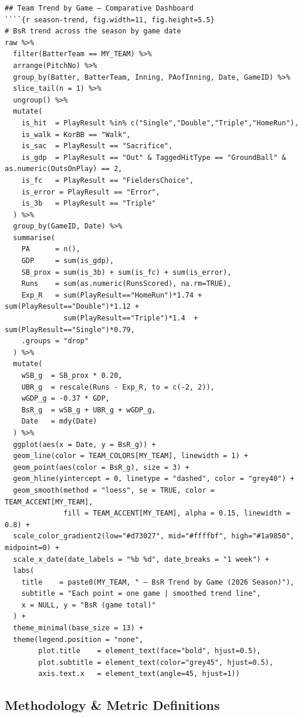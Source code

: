 \documentclass[
]{article}
\begin{document}
\begin{verbatim}
## Team Trend by Game — Comparative Dashboard
````{r season-trend, fig.width=11, fig.height=5.5}
# BsR trend across the season by game date
raw %>%
  filter(BatterTeam == MY_TEAM) %>%
  arrange(PitchNo) %>%
  group_by(Batter, BatterTeam, Inning, PAofInning, Date, GameID) %>%
  slice_tail(n = 1) %>%
  ungroup() %>%
  mutate(
    is_hit  = PlayResult %in% c("Single","Double","Triple","HomeRun"),
    is_walk = KorBB == "Walk",
    is_sac  = PlayResult == "Sacrifice",
    is_gdp  = PlayResult == "Out" & TaggedHitType == "GroundBall" & as.numeric(OutsOnPlay) == 2,
    is_fc   = PlayResult == "FieldersChoice",
    is_error = PlayResult == "Error",
    is_3b   = PlayResult == "Triple"
  ) %>%
  group_by(GameID, Date) %>%
  summarise(
    PA      = n(),
    GDP     = sum(is_gdp),
    SB_prox = sum(is_3b) + sum(is_fc) + sum(is_error),
    Runs    = sum(as.numeric(RunsScored), na.rm=TRUE),
    Exp_R   = sum(PlayResult=="HomeRun")*1.74 + sum(PlayResult=="Double")*1.12 +
              sum(PlayResult=="Triple")*1.4  + sum(PlayResult=="Single")*0.79,
    .groups = "drop"
  ) %>%
  mutate(
    wSB_g  = SB_prox * 0.20,
    UBR_g  = rescale(Runs - Exp_R, to = c(-2, 2)),
    wGDP_g = -0.37 * GDP,
    BsR_g  = wSB_g + UBR_g + wGDP_g,
    Date   = mdy(Date)
  ) %>%
  ggplot(aes(x = Date, y = BsR_g)) +
  geom_line(color = TEAM_COLORS[MY_TEAM], linewidth = 1) +
  geom_point(aes(color = BsR_g), size = 3) +
  geom_hline(yintercept = 0, linetype = "dashed", color = "grey40") +
  geom_smooth(method = "loess", se = TRUE, color = TEAM_ACCENT[MY_TEAM],
              fill = TEAM_ACCENT[MY_TEAM], alpha = 0.15, linewidth = 0.8) +
  scale_color_gradient2(low="#d73027", mid="#ffffbf", high="#1a9850", midpoint=0) +
  scale_x_date(date_labels = "%b %d", date_breaks = "1 week") +
  labs(
    title    = paste0(MY_TEAM, " — BsR Trend by Game (2026 Season)"),
    subtitle = "Each point = one game | smoothed trend line",
    x = NULL, y = "BsR (game total)"
  ) +
  theme_minimal(base_size = 13) +
  theme(legend.position = "none",
        plot.title    = element_text(face="bold", hjust=0.5),
        plot.subtitle = element_text(color="grey45", hjust=0.5),
        axis.text.x   = element_text(angle=45, hjust=1))
\end{verbatim}

\subsection{Methodology \& Metric
Definitions}\label{methodology-metric-definitions}
\end{document}
